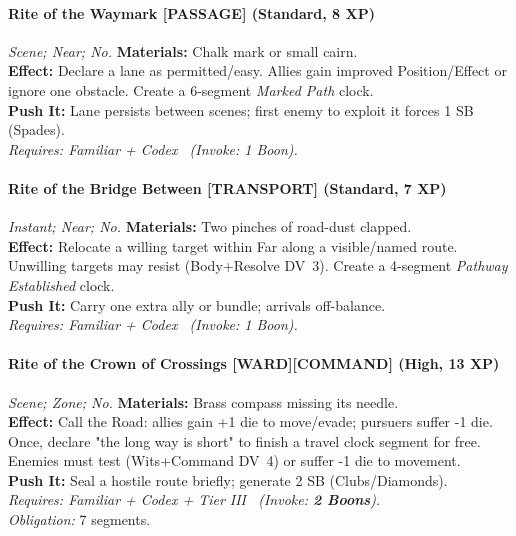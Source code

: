 \paragraph{Rite of the Waymark \textnormal{[PASSAGE]} (Standard, 8 XP)} \emph{Scene; Near; No.}
\textbf{Materials:} Chalk mark or small cairn.\\
\textbf{Effect:} Declare a lane as permitted/easy. Allies gain improved Position/Effect or ignore one obstacle. Create a 6-segment \emph{Marked Path} clock.\\
\textbf{Push It:} Lane persists between scenes; first enemy to exploit it forces 1 SB (Spades).\\
\emph{Requires: Familiar + Codex \ (\textit{Invoke:} 1 Boon).}

\paragraph{Rite of the Bridge Between \textnormal{[TRANSPORT]} (Standard, 7 XP)} \emph{Instant; Near; No.}
\textbf{Materials:} Two pinches of road-dust clapped.\\
\textbf{Effect:} Relocate a willing target within Far along a visible/named route. Unwilling targets may resist (Body+Resolve DV~3). Create a 4-segment \emph{Pathway Established} clock.\\
\textbf{Push It:} Carry one extra ally or bundle; arrivals off-balance.\\
\emph{Requires: Familiar + Codex \ (\textit{Invoke:} 1 Boon).}

\paragraph{Rite of the Crown of Crossings \textnormal{[WARD][COMMAND]} (High, 13 XP)} \emph{Scene; Zone; No.}
\textbf{Materials:} Brass compass missing its needle.\\
\textbf{Effect:} Call the Road: allies gain +1 die to move/evade; pursuers suffer -1 die. Once, declare "the long way is short" to finish a travel clock segment for free. Enemies must test (Wits+Command DV~4) or suffer -1 die to movement.\\
\textbf{Push It:} Seal a hostile route briefly; generate 2 SB (Clubs/Diamonds).\\
\emph{Requires: Familiar + Codex + Tier III \ (\textit{Invoke:} \textbf{2 Boons}).}\\
\emph{Obligation:} 7 segments.

